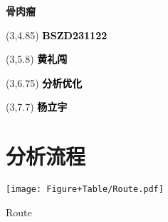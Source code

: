 \documentclass[
]{article}
\author{}
\date{\vspace{-2.5em}}
\begin{document}
\begin{titlepage} 
\begin{center} \textbf{\huge 骨肉瘤}
\vspace{4em} \begin{textblock}{10}(3,4.85) \Large
\textbf{\textcolor{black}{BSZD231122}}
\end{textblock} \begin{textblock}{10}(3,5.8)
\Large \textbf{\textcolor{black}{黄礼闯}}
\end{textblock} \begin{textblock}{10}(3,6.75)
\Large
\textbf{\textcolor{black}{分析优化}}
\end{textblock} \begin{textblock}{10}(3,7.7)
\Large
\textbf{\textcolor{black}{杨立宇}}
\end{textblock} \end{center} \end{titlepage}
\restoregeometry


\begin{center}\vspace{1.5cm}\end{center}\tableofcontents

\begin{center}\vspace{1.5cm}\end{center}\listoffigures

\begin{center}\vspace{1.5cm}\end{center}\listoftables

\newpage


\hypertarget{abstract}{%
\section{分析流程}\label{abstract}}

\begin{center}\vspace{1.5cm}\end{center}
\def\@captype{figure}
\begin{center}
\texttt{[image: Figure+Table/Route.pdf]}
\caption{Route}\label{fig:Route}
\end{center}
\end{document}
